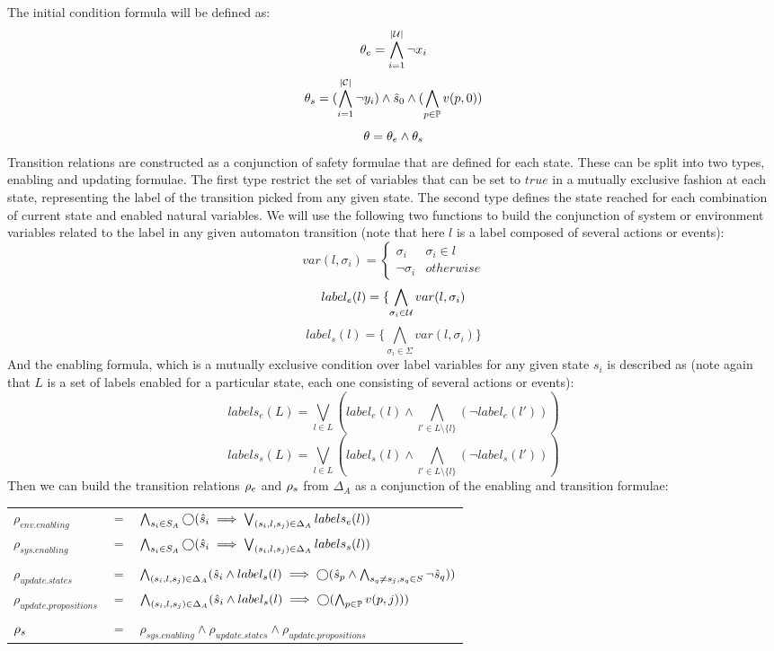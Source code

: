 The initial condition formula will be defined as:
\[{\theta_e} = \bigwedge_{i = 1}^{|{\mathcal{U}}|}\neg x_i\]
\[{\theta_s} = (\bigwedge_{i = 1}^{|\mathcal{C}|}\neg y_i) \wedge \hat{s}_{0} \wedge (\bigwedge_{{p} \in {\mathbb{P}}}v({p},0))\]
\[\theta = {\theta_e} \wedge {\theta_s}\]
Transition relations are constructed as a conjunction of safety formulae that are defined for each state. These can be split into two types, enabling and updating formulae. The first type restrict the set of variables that can be set to $true$ in a mutually exclusive fashion at each state, representing the label of the transition picked from any given state. The second type defines the state reached for each combination of current state and enabled natural variables. 
We will use the following two functions to build the conjunction of system or environment variables related to the label in any given automaton transition (note that here $l$ is a label composed of several actions or events):
\[
var(l, \sigma_i) = \begin{cases}
\sigma_i & \sigma_i \in l \\
\neg \sigma_i & otherwise
\end{cases}
\]
\[label_e(l) = \{\bigwedge_{\sigma_i \in {\mathcal{U}}}var(l, \sigma_i)\]
\[label_s(l) = \{\bigwedge_{\sigma_i \in \Sigma}var(l, \sigma_i)\}\]
And the enabling formula, which is a mutually exclusive condition over label variables for any given state $s_i$ is described as (note again that $L$ is a set of labels enabled for a particular state, each one consisting of several actions or events):
\[labels_e(L) = \bigvee_{l \in L}(label_e(l) \wedge \bigwedge_{l' \in L \setminus \{l\}}(\neg label_e(l')) ) \]
\[labels_s(L) = \bigvee_{l \in L}(label_s(l) \wedge \bigwedge_{l' \in L \setminus \{l\}}(\neg label_s(l')) ) \]
Then we can build the transition relations ${\rho_e}$ and ${\rho_s}$ from $\Delta_A$ as a conjunction of the enabling and transition formulae:

\vspace{1em}
\begin{tabular}{ l c l }
	$\rho_{env.enabling}$ &$=$& $\bigwedge_{s_i \in S_A} \bigcirc(\hat{s}_{i} \implies \bigvee_{(s_i,l,s_j) \in \Delta_A}labels_e(l))$\\
	$\rho_{sys.enabling}$ &$=$& $\bigwedge_{s_i \in S_A} \bigcirc(\hat{s}_{i} \implies \bigvee_{(s_i,l,s_j) \in \Delta_A}labels_s(l))$\\
	&&\\
	$\rho_{update.states}$&$=$&$\bigwedge_{(s_i,l,s_j) \in \Delta_A} (\hat{s}_{i} \wedge label_s(l) \implies \bigcirc(\hat{s}_{p} \wedge\bigwedge_{s_q \neq s_j, s_q \in S}\neg \hat{s}_{q}) ) $\\
	$\rho_{update.propositions}$&$=$&$\bigwedge_{(s_i,l,s_j) \in \Delta_A} (\hat{s}_{i} \wedge label_s(l) \implies \bigcirc(\bigwedge_{{p} \in {\mathbb{P}}}v({p},j) ) )$\\
	&&\\
	${\rho_s}$&$=$&$\rho_{sys.enabling} \wedge  \rho_{update.states} \wedge  \rho_{update.propositions}$\\	
\end{tabular}
\vspace{1em}


